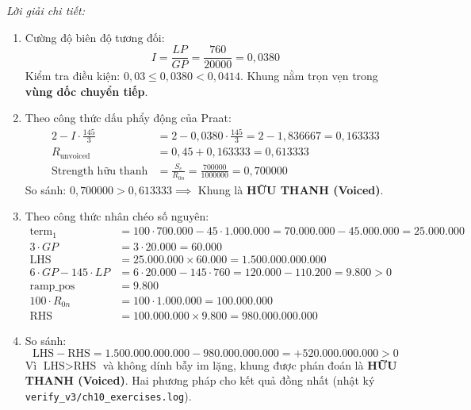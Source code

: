 \textit{Lời giải chi tiết:}
\begin{enumerate}[label=(\alph*)]
    \item Cường độ biên độ tương đối:
    \begin{equation*}
        I = \frac{LP}{GP} = \frac{760}{20000} = 0{,}0380
    \end{equation*}
    Kiểm tra điều kiện: $0{,}03 \le 0{,}0380 < 0{,}0414$. Khung nằm trọn vẹn trong \textbf{vùng dốc chuyển tiếp}.
    \item Theo công thức dấu phẩy động của Praat:
    \begin{align*}
        2 - I \cdot \frac{145}{3} &= 2 - 0{,}0380 \cdot \frac{145}{3} = 2 - 1{,}836667 = 0{,}163333 \\
        R_{\text{unvoiced}} &= 0{,}45 + 0{,}163333 = 0{,}613333 \\
        \text{Strength hữu thanh} &= \frac{S_c}{R_{0n}} = \frac{700000}{1000000} = 0{,}700000
    \end{align*}
    So sánh: $0{,}700000 > 0{,}613333 \implies$ Khung là \textbf{HỮU THANH (Voiced)}.
    \item Theo công thức nhân chéo số nguyên:
    \begin{align*}
        \text{term}_1 &= 100 \cdot 700.000 - 45 \cdot 1.000.000 = 70.000.000 - 45.000.000 = 25.000.000 \\
        3 \cdot GP &= 3 \cdot 20.000 = 60.000 \\
        \text{LHS} &= 25.000.000 \times 60.000 = 1.500.000.000.000 \\
        6 \cdot GP - 145 \cdot LP &= 6 \cdot 20.000 - 145 \cdot 760 = 120.000 - 110.200 = 9.800 > 0 \\
        \text{ramp\_pos} &= 9.800 \\
        100 \cdot R_{0n} &= 100 \cdot 1.000.000 = 100.000.000 \\
        \text{RHS} &= 100.000.000 \times 9.800 = 980.000.000.000
    \end{align*}
    \item So sánh:
    \begin{equation*}
        \text{LHS} - \text{RHS} = 1.500.000.000.000 - 980.000.000.000 = +520.000.000.000 > 0
    \end{equation*}
    Vì $\text{LHS} > \text{RHS}$ và không dính bẫy im lặng, khung được phán đoán là \textbf{HỮU THANH (Voiced)}. Hai phương pháp cho kết quả đồng nhất (nhật ký \texttt{verify\_v3/ch10\_exercises.log}).
\end{enumerate}

